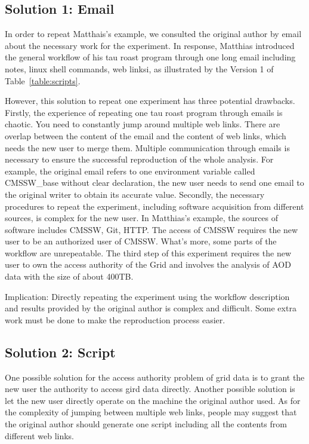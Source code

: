 \documentclass{acm_proc_article-sp}
\begin{document}
\subsection{Solution 1: Email}

In order to repeat Matthais's example, we consulted the original
author by email about the necessary work for the experiment. In response,
Matthias introduced the general workflow of his tau roast program through one long
email including notes, linux shell commands, web linksi, as illustrated by the Version 1 of
Table~\ref{table:scripts}.

However, this solution to repeat one experiment has three potential drawbacks.
Firstly, the experience of repeating one tau roast program through emails is
chaotic. You need to constantly jump around multiple web links. There are overlap
between the content of the email and the content of web links, which needs the
new user to merge them. Multiple communication through emails is necessary to
ensure the successful reproduction of the whole analysis. For example, the original
email refers to one environment variable called CMSSW\_base without clear
declaration, the new user needs to send one email to the original writer to
obtain its accurate value. Secondly, the necessary procedures to repeat the
experiment, including software acquisition from different sources, is complex
for the new user. In Matthias's example, the sources of software includes
CMSSW, Git, HTTP. The access of CMSSW requires the new user to be an authorized
user of CMSSW. What's more, some parts of the workflow are unrepeatable. The
third step of this experiment requires the new user to own the access authority
of the Grid and involves the analysis of AOD data with the size of about 400TB.

Implication: Directly repeating the experiment using the workflow description and results provided by the original author is complex and difficult. Some extra work must be done to make the reproduction process easier.

\subsection{Solution 2: Script} One possible solution for the access authority
problem of grid data is to grant the new user the authority to access gird data
directly. Another possible solution is let the new user directly operate on the
machine the original author used. As for the complexity of jumping between
multiple web links, people may suggest that the original author
should generate one script including all the contents from different web links.
\end{document}
